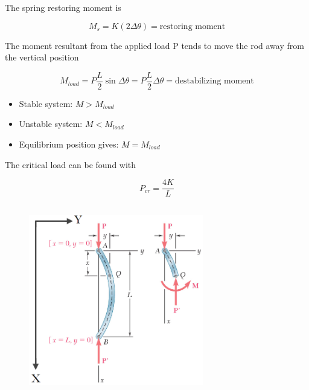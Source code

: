 \noindent The spring restoring moment is 

\[M_s = K(2\Delta\theta)= \text{restoring moment}\]

\noindent The moment resultant from the applied load P tends to move the rod away from the vertical position

\[M_{load} = P\frac{L}{2}\sin\Delta\theta = P\frac{L}{2}\Delta\theta = \text{destabilizing moment}\]

\begin{itemize}
    \item Stable system: $M > M_{load}$
    \item Unstable system: $M < M_{load}$
    \item Equilibrium position gives: $M = M_{load}$
\end{itemize}

\noindent The critical load can be found with

\[P_{cr} = \frac{4K}{L}\]

\noindent {}

\blue{
\[M_s = M_{load}\]
\[K(2\Delta\theta) = P_{cr}\frac{L}{2}\Delta\theta\]
}

\noindent {}


\subsection{}

\clearpage

\subsubsection{}

\begin{figure}[!h]
\centering
\includegraphics[angle=0, width=3in]{Buckling-Figures/Pinned.png}
\vspace{-2mm}
\caption{\small {}}
\vspace{-3mm}
\label{Fig:Pinned}
\end{figure}

